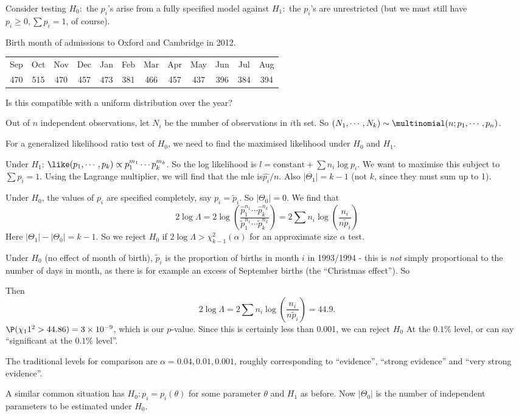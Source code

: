 \documentclass[a4paper]{article}
\begin{document}
Consider testing $H_0:$ the $p_i$'s arise from a fully specified model against $H_1:$ the $p_i$'s are unrestricted (but we must still have $p_i \geq 0, \sum p_i = 1$, of course).

\begin{eg}
  Birth month of admissions to Oxford and Cambridge in 2012.

  \noindent\begin{tabular}{cccccccccccc}
    \toprule
    Sep & Oct & Nov & Dec & Jan & Feb & Mar & Apr & May & Jun & Jul & Aug\\
    470 & 515 & 470 & 457 & 473 & 381 & 466 & 457 & 437 & 396 & 384 & 394\\
    \bottomrule
  \end{tabular}

  Is this compatible with a uniform distribution over the year?

  Out of $n$ independent observations, let $N_i$ be the number of observations in $i$th set. So $(N_1,\cdots, N_k)\sim \multinomial(n; p_1, \cdots, p_n)$.

  For a generalized likelihood ratio test of $H_0$, we need to find the maximised likelihood under $H_0$ and $H_1$.

  Under $H_1$: $\like(p_1, \cdots, p_k) \propto p_1^{m_1}\cdots p_k^{m_k}$. So the log likelihood is $l = \text{constant} + \sum n_i \log p_i$. We want to maximise this subject to $\sum p_i = 1$. Using the Lagrange multiplier, we will find that the mle is$\hat{p_i}/n$. Also $|\Theta_1| = k - 1$ (not $k$, since they must sum up to 1).

  Under $H_0$, the values of $p_i$ are specified completely, say $p_i = \tilde{p}_i$. So $|\Theta_0| = 0$. We find that
  \[
    2\log \Lambda = 2\log\left(\frac{\hat{p}_1^{n_1}\cdots \hat{p}_k^{n_k}}{\tilde{p}_{1}^{n_1}\cdots \tilde{p}_k^{n_k}}\right) = 2\sum n_i \log \left(\frac{n_i}{n\tilde{p}_i}\right)\tag{1}
  \]
  Here $|\Theta_1| - |\Theta_0| = k - 1$. So we reject $H_0$ if $2\log \Lambda > \chi_{k - 1}^2(\alpha)$ for an approximate size $\alpha$ test.

  Under $H_0$ (no effect of month of birth), $\tilde{p}_i$ is the proportion of births in month $i$ in 1993/1994 - this is \emph{not} simply proportional to the number of days in month, as there is for example an excess of September births (the ``Christmas effect''). So

  Then
  \[
    2\log \Lambda = 2\sum n_i \log\left(\frac{n_i}{n\tilde{p}_i}\right) = 44.9.
  \]
  $\P(\chi_11^2 > 44.86) = 3\times 10^{-9}$, which is our $p$-value. Since this is certainly less than 0.001, we can reject $H_0$ At the $0.1\%$ level, or can say ``significant at the $0.1\%$ level''.

  \note The traditional levels for comparison are $\alpha = 0.04, 0.01, 0.001$, roughly corresponding to ``evidence'', ``strong evidence'' and ``very strong evidence''.
\end{eg}
A similar common situation has $H_0: p_i = p_i(\theta)$ for some parameter $\theta$ and $H_1$ as before. Now $|\Theta_0|$ is the number of independent parameters to be estimated under $H_0$.
\end{document}
